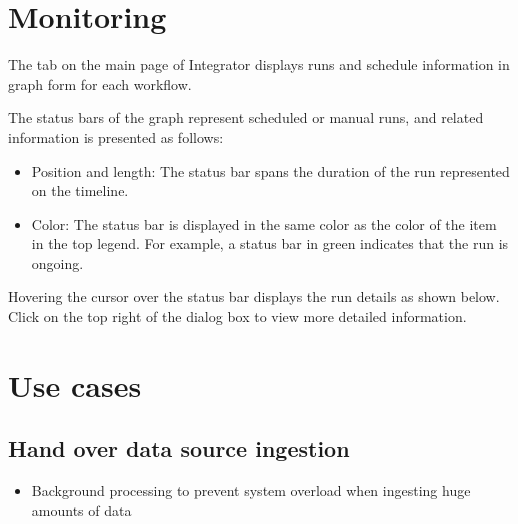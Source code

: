 \documentclass[letterpaper,10pt,english]{sphinxmanual}
\begin{document}
\chapter{Monitoring}
\label{\detokenize{integrator/part04/index:id1}}\label{\detokenize{integrator/part04/index::doc}}
The  tab on the main page of Integrator displays runs and schedule information in graph form for each workflow.
\begin{quote}

\begin{figure}[H]
\centering

\noindent{}
\end{figure}
\end{quote}

The status bars of the graph represent scheduled or manual runs, and related information is presented as follows:
\begin{itemize}
\item {} 
Position and length: The status bar spans the duration of the run represented on the timeline.

\item {} 
Color: The status bar is displayed in the same color as the color of the  item in the top legend. For example, a status bar in green indicates that the run is ongoing.

\end{itemize}

Hovering the cursor over the status bar displays the run details as shown below. Click  on the top right of the dialog box to view more detailed information.
\begin{quote}

\begin{figure}[H]
\centering

\noindent{}
\end{figure}
\end{quote}


\chapter{Use cases}
\label{\detokenize{integrator/part05/index:use-case}}\label{\detokenize{integrator/part05/index::doc}}

\section{Hand over data source ingestion}
\label{\detokenize{integrator/part05/index:id1}}\begin{itemize}
\item {} 
Background processing to prevent system overload when ingesting huge amounts of data

\end{itemize}
\end{document}
